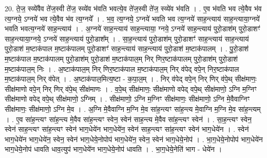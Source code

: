 \documentclass[17pt]{extarticle}
\begin{document}
20. ते॒ज॒ स्व्ये॑वैव ते॑ज॒स्वी ते॑ज॒ स्व्ये॑व भ॑वति भवत्ये॒व ते॑ज॒स्वी ते॑ज॒ स्व्ये॑व भ॑वति । . ए॒व भ॑वति भव त्ये॒वैव भ॑व त्य॒ग्नये॒ ऽग्नये॑ भव त्ये॒वैव भ॑व त्य॒ग्नये᳚ । . भ॒व॒ त्य॒ग्नये॒ ऽग्नये॑ भवति भव त्य॒ग्नये॑ साह॒न्त्याय॑ साह॒न्त्याया॒ग्नये॑ भवति भवत्य॒ग्नये॑ साह॒न्त्याय॑ । . अ॒ग्नये॑ साह॒न्त्याय॑ साह॒न्त्याया॒ ग्नये॒ ऽग्नये॑ साह॒न्त्याय॑ पुरो॒डाश॑म् पुरो॒डाशꣳ॑ साह॒न्त्याया॒ग्नये॒ ऽग्नये॑ साह॒न्त्याय॑ पुरो॒डाश᳚म् । . सा॒ह॒न्त्याय॑ पुरो॒डाश॑म् पुरो॒डाशꣳ॑ साह॒न्त्याय॑ साह॒न्त्याय॑ पुरो॒डाश॑ म॒ष्टाक॑पाल म॒ष्टाक॑पालम् पुरो॒डाशꣳ॑ साह॒न्त्याय॑ साह॒न्त्याय॑ पुरो॒डाश॑ म॒ष्टाक॑पालम् । . पु॒रो॒डाश॑ म॒ष्टाक॑पाल म॒ष्टाक॑पालम् पुरो॒डाश॑म् पुरो॒डाश॑ म॒ष्टाक॑पाल॒म् निर् णिर॒ष्टाक॑पालम् पुरो॒डाश॑म् पुरो॒डाश॑ म॒ष्टाक॑पाल॒म् निः । . अ॒ष्टाक॑पाल॒म् निर् णिर॒ष्टाक॑पाल म॒ष्टाक॑पाल॒म् निर् व॑पेद् वपे॒न् निर॒ष्टाक॑पाल म॒ष्टाक॑पाल॒म् निर् व॑पेत् । . अ॒ष्टाक॑पाल॒मित्य॒ष्टा - क॒पा॒ल॒म् । . निर् व॑पेद् वपे॒न् निर् णिर् व॑पे॒थ् सीक्ष॑माणः॒ सीक्ष॑माणो वपे॒न् निर् णिर् व॑पे॒थ् सीक्ष॑माणः । . व॒पे॒थ् सीक्ष॑माणः॒ सीक्ष॑माणो वपेद् वपे॒थ् सीक्ष॑माणो॒ ऽग्नि म॒ग्निꣳ सीक्ष॑माणो वपेद् वपे॒थ् सीक्ष॑माणो॒ ऽग्निम् । . सीक्ष॑माणो॒ ऽग्नि म॒ग्निꣳ सीक्ष॑माणः॒ सीक्ष॑माणो॒ ऽग्नि मे॒वैवाग्निꣳ सीक्ष॑माणः॒ सीक्ष॑माणो॒ ऽग्नि मे॒व । . अ॒ग्नि मे॒वैवाग्नि म॒ग्नि मे॒व सा॑ह॒न्त्यꣳ सा॑ह॒न्त्य मे॒वाग्नि म॒ग्नि मे॒व सा॑ह॒न्त्यम् । . ए॒व सा॑ह॒न्त्यꣳ सा॑ह॒न्त्य मे॒वैव सा॑ह॒न्त्यꣳ स्वेन॒ स्वेन॑ साह॒न्त्य मे॒वैव सा॑ह॒न्त्यꣳ स्वेन॑ । . सा॒ह॒न्त्यꣳ स्वेन॒ स्वेन॑ साह॒न्त्यꣳ सा॑ह॒न्त्यꣳ स्वेन॑ भाग॒धेये॑न भाग॒धेये॑न॒ स्वेन॑ साह॒न्त्यꣳ सा॑ह॒न्त्यꣳ स्वेन॑ भाग॒धेये॑न । . स्वेन॑ भाग॒धेये॑न भाग॒धेये॑न॒ स्वेन॒ स्वेन॑ भाग॒धेये॒नोपोप॑ भाग॒धेये॑न॒ स्वेन॒ स्वेन॑ भाग॒धेये॒नोप॑ । . भा॒ग॒धेये॒नोपोप॑ भाग॒धेये॑न भाग॒धेये॒नोप॑ धावति धाव॒त्युप॑ भाग॒धेये॑न भाग॒धेये॒नोप॑ धावति । . भा॒ग॒धेये॒नेति॑ भाग - धेये॑न । \newline
\end{document}
